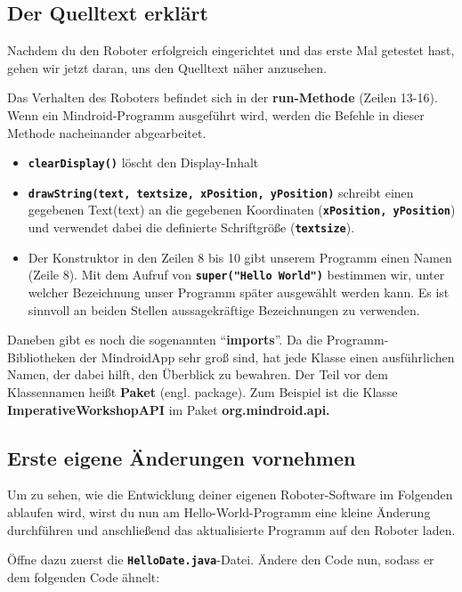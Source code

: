 \documentclass[
	12pt,
	article,
	type=bsc, %
	colorbacktitle,
	instlogo,
	accentcolor=tud1c,
	german,
	twoside
]{tudexercise}
\newcommand{\solpath}[0]{../../impl/androidApp/app/src/main/java/org/mindroid/android/app/programs/workshop/solutions}
\newcommand{\bfcode}[1]{\texttt{\textbf{#1}}}
\begin{document}
	\subsection{Der Quelltext erklärt}
	Nachdem du den Roboter erfolgreich eingerichtet und das erste Mal getestet hast, gehen wir jetzt daran, uns den Quelltext näher anzusehen.
	
	Das Verhalten des Roboters befindet sich in der \textbf{run-Methode }(Zeilen 13-16). Wenn ein Mindroid-Programm ausgeführt wird, werden die Befehle in dieser Methode nacheinander abgearbeitet.
		\begin{itemize}
		\item{\bfcode{clearDisplay()}} löscht den Display-Inhalt
		\item{\bfcode{drawString(text, textsize, xPosition, yPosition)}} schreibt einen gegebenen Text(text) an die gegebenen Koordinaten (\bfcode{xPosition, yPosition}) und verwendet dabei die definierte Schriftgröße (\bfcode{textsize}).
		\item Der Konstruktor in den Zeilen 8 bis 10 gibt unserem Programm einen Namen (Zeile 8). Mit dem Aufruf von \bfcode{super("Hello World")} bestimmen wir, unter welcher Bezeichnung unser Programm später ausgewählt werden kann. Es ist sinnvoll an beiden Stellen aussagekräftige Bezeichnungen zu verwenden.
		\end{itemize}
		Daneben gibt es noch die sogenannten “\textbf{imports}”. Da die Programm-Bibliotheken der MindroidApp sehr groß sind, hat jede Klasse einen ausführlichen Namen, der dabei hilft, den Überblick zu bewahren. Der Teil vor dem Klassennamen heißt \textbf{Paket} (engl. package). Zum Beispiel ist die Klasse \textbf{ImperativeWorkshopAPI} im Paket \textbf{org.mindroid.api.}
		
		\subsection{Erste eigene Änderungen vornehmen}
		Um zu sehen, wie die Entwicklung deiner eigenen Roboter-Software im Folgenden ablaufen wird, wirst du nun am Hello-World-Programm eine kleine Änderung durchführen und anschließend das aktualisierte Programm auf den Roboter laden.
		
		Öffne dazu zuerst die \bfcode{HelloDate.java}-Datei. Ändere den Code nun, sodass er dem folgenden Code ähnelt:
		
\end{document}
